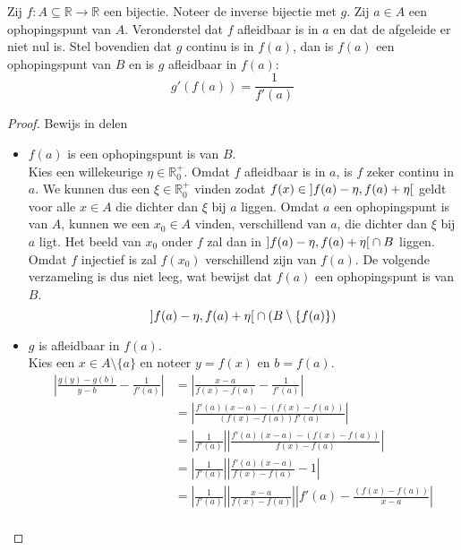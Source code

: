 \documentclass[main.tex]{subfiles}
\begin{document}
\begin{st}
  Zij $f: A \subseteq \mathbb{R} \rightarrow \mathbb{R}$ een bijectie.
  Noteer de inverse bijectie met $g$.
  Zij $a \in A$ een ophopingspunt van $A$.
  Veronderstel dat $f$ afleidbaar is in $a$ en dat de afgeleide er niet nul is.
  Stel bovendien dat $g$ continu is in $f(a)$, dan is $f(a)$ een ophopingspunt van $B$ en is $g$ afleidbaar in $f(a)$:
  \[ g'(f(a)) = \frac{1}{f'(a)} \]

  \begin{proof}
    Bewijs in delen
    \begin{itemize}
    \item $f(a)$ is een ophopingspunt is van $B$.\\
      Kies een willekeurige $\eta \in \mathbb{R}_{0}^{+}$.
      Omdat $f$ afleidbaar is in $a$, is $f$ zeker continu in $a$.
      We kunnen dus een $\xi\in \mathbb{R}_{0}^{+}$ vinden zodat $f(x) \in \interval[open]{f(a)-\eta}{f(a)+\eta}$ geldt voor alle $x\in A$ die dichter dan $\xi$ bij $a$ liggen.
      Omdat $a$ een ophopingspunt is van $A$, kunnen we een $x_{0}\in A$ vinden, verschillend van $a$, die dichter dan $\xi$ bij $a$ ligt.
      Het beeld van $x_{0}$ onder $f$ zal dan in $\interval[open]{f(a)-\eta}{f(a)+\eta}\cap B$ liggen.
      Omdat $f$ injectief is zal $f(x_{0})$ verschillend zijn van $f(a)$.
      De volgende verzameling is dus niet leeg, wat bewijst dat $f(a)$ een ophopingspunt is van $B$.
      \[ \interval[open]{f(a)-\eta}{f(a)+\eta}\cap (B \setminus \{f(a)\}) \]
    \item $g$ is afleidbaar in $f(a)$.\\
      Kies een $x\in A\setminus \{a\}$ en noteer $y=f(x)$ en $b=f(a)$.
      \[ 
      \begin{array}{rl}
        \left| \frac{g(y)-g(b)}{y-b} - \frac{1}{f'(a)} \right|
        &= \left| \frac{x-a}{f(x)-f(a)} - \frac{1}{f'(a)} \right|\\
        &= \left| \frac{f'(a)(x-a)-(f(x)-f(a))}{(f(x)-f(a))f'(a)} \right|\\
        &= \left| \frac{1}{f'(a)}\right|\left| \frac{f'(a)(x-a)-(f(x)-f(a))}{f(x)-f(a)} \right|\\
        &= \left| \frac{1}{f'(a)}\right|\left|\frac{f'(a)(x-a)}{f(x)-f(a)} -1 \right|\\
        &= \left| \frac{1}{f'(a)} \right| \left| \frac{x-a}{f(x)-f(a)} \right| \left| f'(a)-\frac{(f(x)-f(a))}{x-a} \right|\\
      \end{array}
\]
\end{itemize}
\end{proof}
\end{st}
\end{document}
